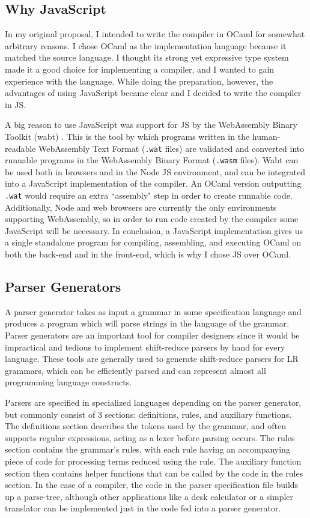 \documentclass[12pt,a4paper,twoside,openright]{report}
\begin{document}
\subsection{Why JavaScript}
In my original proposal, I intended to write the compiler in OCaml for somewhat arbitrary reasons.
I chose OCaml as the implementation language because it matched the source language.
I thought its strong yet expressive type system made it a good choice for implementing a compiler, and I wanted to gain experience with the language.
While doing the preparation, however, the advantages of using JavaScript became clear and I decided to write the compiler in JS.

A big reason to use JavaScript was support for JS by the WebAssembly Binary Toolkit (wabt) \cite{wabt}.
This is the tool by which programs written in the human-readable WebAssembly Text Format ({\tt .wat} files) are validated and converted into runnable programs in the WebAssembly Binary Format ({\tt .wasm} files).
Wabt can be used both in browsers and in the Node JS environment, and can be integrated into a JavaScript implementation of the compiler.
An OCaml version outputting {\tt .wat} would require an extra ``assembly" step in order to create runnable code.
Additionally, Node and web browsers are currently the only environments supporting WebAssembly, so in order to run code created by the compiler some JavaScript will be necessary.
In conclusion, a JavaScript implementation gives us a single standalone program for compiling, assembling, and executing OCaml on both the back-end and in the front-end, which is why I chose JS over OCaml.

\subsection{Parser Generators}
A parser generator takes as input a grammar in some specification language and produces a program which will parse strings in the language of the grammar.
Parser generators are an important tool for compiler designers since it would be impractical and tedious to implement shift-reduce parsers by hand for every language.
These tools are generally used to generate shift-reduce parsers for LR grammars, which can be efficiently parsed and can represent almost all programming language constructs.

Parsers are specified in specialized languages depending on the parser generator, but commonly consist of 3 sections: definitions, rules, and auxiliary functions.
The definitions section describes the tokens used by the grammar, and often supports regular expressions, acting as a lexer before parsing occurs.
The rules section contains the grammar's rules, with each rule having an accompanying piece of code for processing terms reduced using the rule.
The auxiliary function section then contains helper functions that can be called by the code in the rules section.
In the case of a compiler, the code in the parser specification file builds up a parse-tree, although other applications like a desk calculator or a simpler translator can be implemented just in the code fed into a parser generator.
\end{document}
